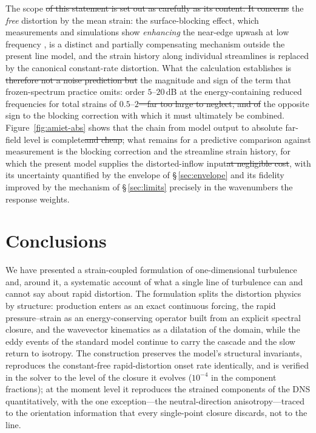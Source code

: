 \documentclass[lineno]{JFM-FLM_Au}
\providecommand{\DIFadd}[1]{{\protect\color{blue}\uwave{#1}}} %
\providecommand{\DIFdel}[1]{{\protect\color{red}\sout{#1}}} %
\providecommand{\DIFaddbegin}{} %
\providecommand{\DIFaddend}{} %
\providecommand{\DIFdelbegin}{} %
\providecommand{\DIFdelend}{} %
\begin{document}
The scope \DIFdelbegin \DIFdel{of this statement is set out as carefully as its content.
It concerns }\DIFdelend \DIFaddbegin \DIFadd{is limited to }\DIFaddend the \emph{free} distortion by the mean strain: the
surface-blocking effect, which measurements and simulations show
\emph{enhancing} the near-edge upwash at low frequency
\citep{HuntGraham1978,dosSantos2023,Piccolo2024}, is a distinct and
partially compensating mechanism outside the present line model, and
the strain history along individual streamlines is replaced by the
canonical constant-rate distortion. What the calculation establishes
is \DIFdelbegin \DIFdel{therefore not a noise prediction but }\DIFdelend the magnitude and sign of the term that frozen-spectrum practice omits: order $5$--$20$\,dB at the
energy-containing reduced frequencies for total strains of
$0.5$--$2$\DIFdelbegin \DIFdel{---far too large to neglect, and of }\DIFdelend \DIFaddbegin \DIFadd{---of }\DIFaddend the opposite sign to the
blocking correction with which it must ultimately be combined.
Figure~\ref{fig:amiet-abs} shows that the chain from model output to absolute far-field level is complete\DIFdelbegin \DIFdel{and cheap}\DIFdelend ; what remains for a
predictive comparison against measurement is the blocking correction
and the streamline strain history, for which the present model
supplies the distorted-inflow input\DIFdelbegin \DIFdel{at negligible cost}\DIFdelend , with its
uncertainty quantified by the envelope of \S\,\ref{sec:envelope} and
its fidelity improved by the mechanism of \S\,\ref{sec:limits}
precisely in the wavenumbers the response weights.

\section{Conclusions}\label{sec:conclusions}

We have presented a strain-coupled formulation of one-dimensional
turbulence and, around it, a systematic account of what a single line of
turbulence can and cannot say about rapid distortion. The formulation
splits the distortion physics by structure: production enters as an
exact continuous forcing, the rapid pressure--strain as an
energy-conserving operator built from an explicit spectral closure, and
the wavevector kinematics as a dilatation of the domain, while the eddy
events of the standard model continue to carry the cascade and the slow
return to isotropy. The construction preserves the model's structural
invariants, reproduces the constant-free rapid-distortion onset rate
identically, and is verified in the solver to the level of the closure
it evolves ($10^{-4}$ in the component fractions); at the moment level
it reproduces the strained components of the \citet{LeeReynolds1985}
DNS quantitatively, with the one exception---the neutral-direction
anisotropy---traced to the orientation information that every
single-point closure discards, not to the line.
\end{document}
